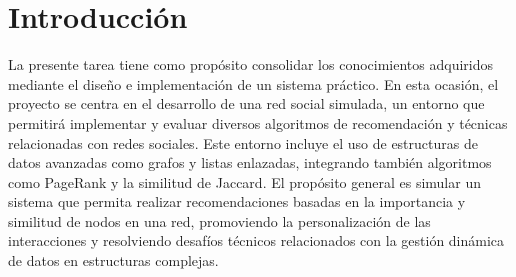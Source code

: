 \section{Introducción}
La presente tarea tiene como propósito consolidar los conocimientos adquiridos mediante el 	diseño e implementación de un sistema práctico. En esta ocasión, el proyecto se centra en el desarrollo de una red social simulada, un entorno que permitirá implementar y evaluar diversos algoritmos de recomendación y técnicas relacionadas con redes sociales. Este entorno incluye el uso de estructuras de datos avanzadas como grafos y listas enlazadas, integrando también algoritmos como PageRank y la similitud de Jaccard.
El propósito general es simular un sistema que permita realizar recomendaciones basadas en la importancia y similitud de nodos en una red, promoviendo la personalización de las interacciones y resolviendo desafíos técnicos relacionados con la gestión dinámica de datos en estructuras complejas.
